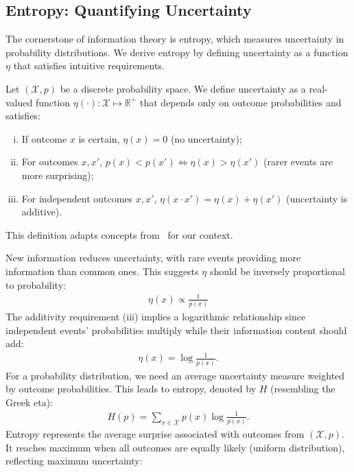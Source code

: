 \subsection{Entropy: Quantifying Uncertainty}
The cornerstone of information theory is entropy, which measures uncertainty in probability distributions. We derive entropy by defining uncertainty as a function $\eta$ that satisfies intuitive requirements.
\begin{definition}
	Let $(\mathcal{X}, p)$ be a discrete probability space. We define \textnormal{\sffamily uncertainty} as a real-valued function $\eta(\cdot): \mathcal{X} \mapsto \mathbb{R}^+$ that depends only on outcome probabilities and satisfies:
	\begin{enumerate}[(i)]
		\item If outcome $x$ is certain, $\eta(x) = 0$ (no uncertainty);
		\item For outcomes $x, x'$, $p(x) < p(x') \iff \eta(x) > \eta(x')$ (rarer events are more surprising);
		\item For independent outcomes $x, x'$, $\eta(x \cdot x') = \eta(x) + \eta(x')$ (uncertainty is additive).
	\end{enumerate}
\end{definition}
\begin{remark}
	This definition adapts concepts from~\cite{ref:martin-2011} for our context.
\end{remark}
New information reduces uncertainty, with rare events providing more information than common ones. This suggests $\eta$ should be inversely proportional to probability:
\begin{align}
	\label{eq:eta-1}
	\eta(x) \propto \frac{1}{p(x)}
\end{align}
The additivity requirement (iii) implies a logarithmic relationship since independent events' probabilities multiply while their information content should add:
\begin{align}
	\label{eq:eta-3}
	\eta(x) = \log\frac{1}{p(x)}.
\end{align}
For a probability distribution, we need an average uncertainty measure weighted by outcome probabilities. This leads to entropy, denoted by $H$ (resembling the Greek eta):
\begin{align}
	\label{eq:eta-almost}
	H(p) = \sum_{x \in \mathcal{X}} p(x) \log\frac{1}{p(x)}.
\end{align}
Entropy represents the average surprise associated with outcomes from $(\mathcal{X}, p)$. It reaches maximum when all outcomes are equally likely (uniform distribution), reflecting maximum uncertainty:
